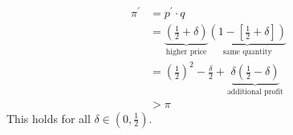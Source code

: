 \begin{align*}
  \pi^\prime &= p^\prime \cdot q\\
             &= \underbrace{\left(\frac{1}{2} + \delta\right)}_{\text{higher price}} \underbrace{\left(1 - \left[\frac{1}{2} + \delta\right]\right)}_{\text{same quantity}}\\
             &= \left(\frac{1}{2}\right)^2 - \frac{\delta}{2} + \underbrace{\delta \left(\frac{1}{2} - \delta\right)}_{\text{additional profit}}\\
  &> \pi
\end{align*}
This holds for all $\delta \in \left(0, \frac{1}{2}\right)$.

